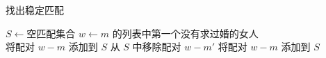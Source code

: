 \documentclass[11pt]{article}
\begin{document}
\begin{CJK*}{UTF8}{gkai}
  \begin{algorithm}
    \caption{找出稳定匹配}
    \begin{algorithmic}[1]
      \State $S \gets \text{空匹配集合}$
        \State $w \gets m \text{ 的列表中第一个没有求过婚的女人}$
          \State $\text{将配对 } w-m \text{ 添加到 } S$
          \State $\text{从 } S \text{ 中移除配对 } w-m'$
          \State $\text{将配对 } w-m \text{ 添加到 } S$
        \EndIf
      \EndWhile
      \State
    \end{algorithmic}
  \end{algorithm}
\end{CJK*}
\end{document}
